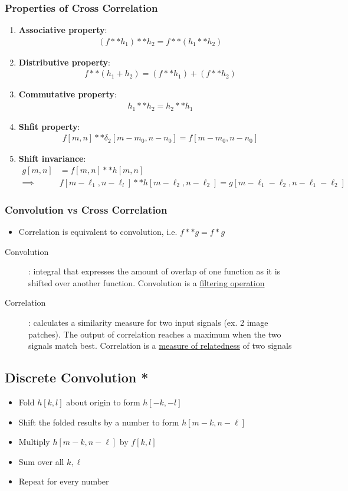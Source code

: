 \documentclass[letterpaper,12pt]{article}
\begin{document}
\subsubsection{Properties of Cross Correlation}
\begin{enumerate}
 \item \textbf{Associative property}:
       \begin{align}
        (f**h_1)**h_2 = f**(h_1 ** h_2)
       \end{align}
 \item \textbf{Distributive property}:
       \begin{align}
        f**(h_1 + h_2) = (f**h_1) + (f**h_2)
       \end{align}
 \item \textbf{Commutative property}:
       \begin{align}
        h_1 ** h_2 = h_2 ** h_1
       \end{align}
 \item \textbf{Shfit property}:
       \begin{align}
        f[m,n] ** \delta_2[m-m_0,n-n_0] = f[m-m_0,n-n_0]
       \end{align}
 \item \textbf{Shift invariance}:
       \begin{align}
        g[m,n]   & = f[m,n] ** h[m,n]                            \\
        \implies & f[m-\ell_1,n-\ell_l] ** h[m-\ell_2, n-\ell_2]
        = g[m-\ell_1 - \ell_2, n-\ell_1 -\ell_2]
       \end{align}
\end{enumerate}

\subsubsection{Convolution vs Cross Correlation}
\begin{itemize}
 \item Correlation is equivalent to convolution, i.e. $f**g = f*g$
\end{itemize}
\begin{description}
 \item[Convolution]: integral that expresses the amount of overlap of one function as it is shifted over another function. Convolution is a \underline{filtering operation}
 \item[Correlation]: calculates a similarity measure for two input signals (ex. 2 image patches). The output of correlation reaches a maximum when the two signals match best. Correlation is a \underline{measure of relatedness} of two signals
\end{description}

\subsection{Discrete Convolution *}
\begin{itemize}
 \item Fold $h[k,l]$ about origin to form $h[-k,-l]$
 \item Shift the folded results by a number to form $h[m-k, n-\ell]$
 \item Multiply $h[m-k, n-\ell]$ by $f[k,l]$
 \item Sum over all $k,\ell$
 \item Repeat for every number
\end{itemize}
\end{document}
